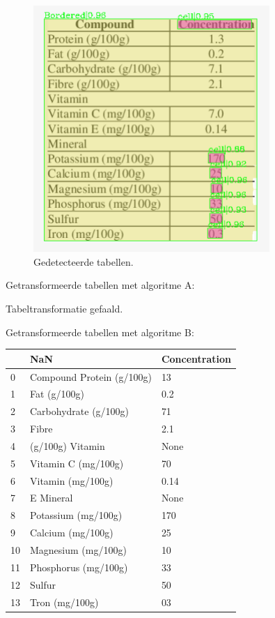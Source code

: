\begin{figure}[H]
    \centering
    \includegraphics[width=0.8\textwidth]{test-resultaten/27/detected_tables.png}
    \caption{Gedetecteerde tabellen.}
\end{figure}

Getransformeerde tabellen met algoritme A:

Tabeltransformatie gefaald.

Getransformeerde tabellen met algoritme B:

\begin{tabular}{lll}
\toprule
{} &                        NaN & Concentration \\
\midrule
0  &  Compound Protein (g/100g) &            13 \\
1  &               Fat (g/100g) &           0.2 \\
2  &      Carbohydrate (g/100g) &            71 \\
3  &                      Fibre &           2.1 \\
4  &           (g/100g) Vitamin &          None \\
5  &        Vitamin C (mg/100g) &            70 \\
6  &          Vitamin (mg/100g) &          0.14 \\
7  &                  E Mineral &          None \\
8  &        Potassium (mg/100g) &           170 \\
9  &          Calcium (mg/100g) &            25 \\
10 &        Magnesium (mg/100g) &            10 \\
11 &       Phosphorus (mg/100g) &            33 \\
12 &                     Sulfur &            50 \\
13 &             Tron (mg/100g) &            03 \\
\bottomrule
\end{tabular}
